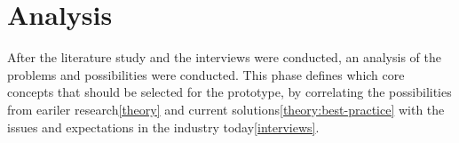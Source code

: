 \section{Analysis}
After the literature study and the interviews were conducted, an analysis of the problems and possibilities were conducted. This phase defines which core concepts that should be selected for the prototype, by correlating the possibilities from eariler research\ref{theory} and current solutions\ref{theory:best-practice} with the issues and expectations in the industry today\ref{interviews}.
